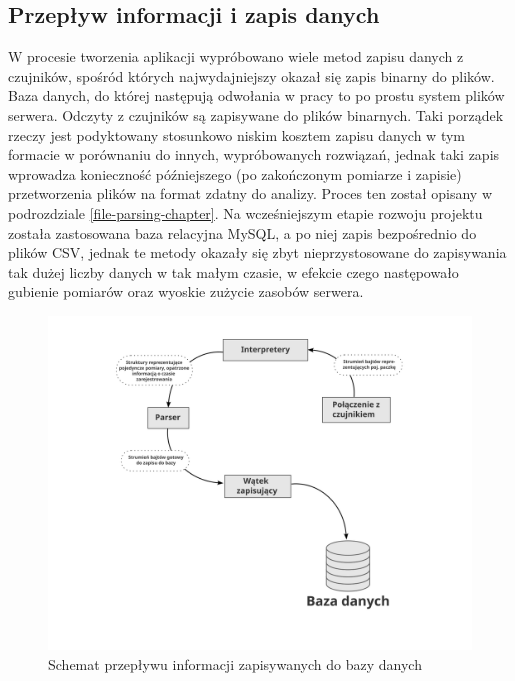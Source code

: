 \documentclass[12pt,oneside,a4paper]{book}
\theoremstyle{break}
\begin{document}
\subsection{Przepływ informacji i zapis danych}

W procesie tworzenia aplikacji wypróbowano wiele metod 
zapisu danych z czujników, spośród których najwydajniejszy okazał
się zapis binarny do plików. Baza danych, do której następują odwołania w 
pracy to po prostu 
system plików serwera. Odczyty z czujników są zapisywane do plików binarnych.
Taki porządek rzeczy jest podyktowany stosunkowo niskim kosztem zapisu
danych w tym formacie w porównaniu do innych, wypróbowanych rozwiązań,
jednak taki zapis wprowadza konieczność późniejszego (po zakończonym pomiarze 
i zapisie) przetworzenia plików na format zdatny do analizy. Proces ten
został opisany w podrozdziale \ref*{file-parsing-chapter}.
Na wcześniejszym etapie rozwoju projektu została zastosowana baza 
relacyjna MySQL, a po niej zapis bezpośrednio do plików CSV, 
jednak te metody okazały się zbyt nieprzystosowane
do zapisywania tak dużej liczby danych w tak małym czasie, w 
efekcie czego następowało gubienie pomiarów oraz wyoskie zużycie zasobów
serwera. 
\begin{figure}[H]
    \begin{center}
        \includegraphics[width=\textwidth]{schemat_przeplywu_zapisu_danych.png}        
        \caption{Schemat przepływu informacji zapisywanych do bazy danych}        
        \label{rys:database-save-flow}
    \end{center}
\end{figure}
\end{document}
